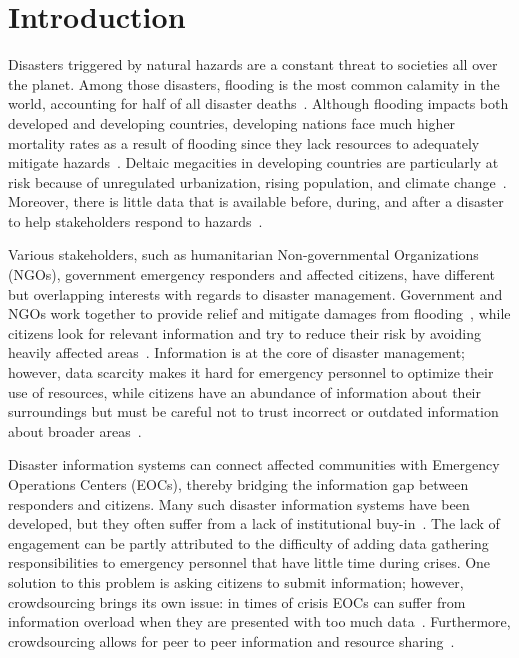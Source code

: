 \chapter{Introduction} Disasters triggered by natural hazards are a constant
threat to societies all over the planet. Among those disasters, flooding is the
most common calamity in the world, accounting for half of all disaster
deaths~\cite{chanFloodRiskAsia2012, ohlFloodingHumanHealth2000}.
Although flooding impacts both developed and developing countries, developing
nations face much higher mortality rates as a result of flooding since they lack
resources to adequately mitigate
hazards~\cite{quarantelliUrbanVulnerabilityDisasters2003,
ahernGlobalHealthImpacts2005}. Deltaic megacities in developing countries are
particularly at risk because of unregulated urbanization, rising population, and
climate change~\cite{chanFloodRiskAsia2012}.  Moreover, there is little data
that is available before, during, and after a disaster to help stakeholders
respond to hazards~\cite{meierDigitalHumanitariansHow2015}.

Various stakeholders, such as humanitarian Non-governmental Organizations (NGOs),
government emergency responders and affected citizens, have different but
overlapping interests with regards to disaster management.  Government and NGOs
work together to provide relief and mitigate damages from
flooding~\cite{chanResilientFloodRisk2018}, while citizens
look for relevant information and try to reduce their
risk by avoiding heavily affected
areas~\cite{viewegMicrobloggingTwoNatural2010}. Information is at the core of
disaster management; however, data scarcity makes it hard for emergency
personnel to optimize their use of resources, while citizens have an abundance
of information about their surroundings but must be careful not to trust
incorrect or outdated information about broader
areas~\cite{quarantelliProblematicalAspectsInformation1997}.

Disaster information systems can connect affected communities with
Emergency Operations Centers (EOCs), thereby bridging the information gap
between responders and citizens. Many such disaster information systems have
been developed, but they often suffer from a lack of institutional
buy-in~\cite{aminDataNaturalDisasters2008}. The lack of engagement can be partly
attributed to the difficulty of adding data gathering responsibilities to
emergency personnel that have little time during crises. One solution to this
problem is asking citizens to submit information; however, crowdsourcing brings
its own issue: in times of crisis EOCs can suffer from information overload when
they are presented with too much
data~\cite{tierneyFacingUnexpectedDisaster2001}. Furthermore, crowdsourcing
allows for peer to peer information and resource sharing~\cite{meierDigitalHumanitariansHow2015}.

